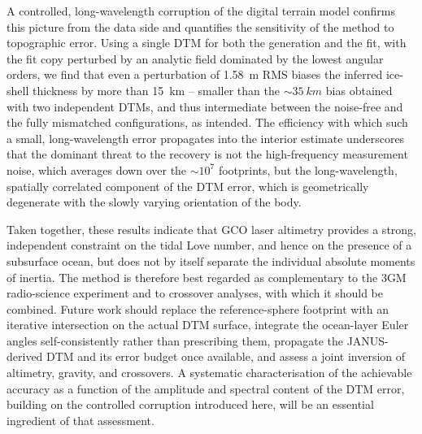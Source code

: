 \documentclass[lineno, pdflatex,sn-mathphys-ay]{sn-jnl}
\theoremstyle{thmstyleone}%
\theoremstyle{thmstyletwo}%
\theoremstyle{thmstylethree}%
\begin{document}
A controlled, long-wavelength corruption of the digital terrain model confirms this picture from the data side and quantifies the sensitivity of the method to topographic error. Using a single DTM for both the generation and the fit, with the fit copy perturbed by an analytic field dominated by the lowest angular orders, we find that even a perturbation of \SI{1.58}{m} RMS biases the inferred ice-shell thickness by more than \SI{15}{km} -- smaller than the $\sim\!\SI{35}{km}$ bias obtained with two independent DTMs, and thus intermediate between the noise-free and the fully mismatched configurations, as intended. The efficiency with which such a small, long-wavelength error propagates into the interior estimate underscores that the dominant threat to the recovery is not the high-frequency measurement noise, which averages down over the $\sim\!10^{7}$ footprints, but the long-wavelength, spatially correlated component of the DTM error, which is geometrically degenerate with the slowly varying orientation of the body.

Taken together, these results indicate that GCO laser altimetry provides a strong, independent constraint on the tidal Love number, and hence on the presence of a subsurface ocean, but does not by itself separate the individual absolute moments of inertia. The method is therefore best regarded as complementary to the 3GM radio-science experiment and to crossover analyses, with which it should be combined. Future work should replace the reference-sphere footprint with an iterative intersection on the actual DTM surface, integrate the ocean-layer Euler angles self-consistently rather than prescribing them, propagate the JANUS-derived DTM and its error budget once available, and assess a joint inversion of altimetry, gravity, and crossovers. A systematic characterisation of the achievable accuracy as a function of the amplitude and spectral content of the DTM error, building on the controlled corruption introduced here, will be an essential ingredient of that assessment.
\end{document}
